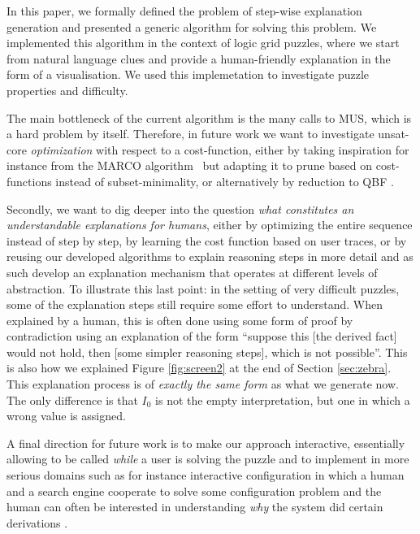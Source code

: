 In this paper, we formally defined the problem of step-wise explanation generation and presented a generic algorithm for solving this problem. 
We implemented this algorithm in the context of logic grid puzzles, where we start from natural language clues and provide a human-friendly explanation in the form of a visualisation.
We used this implemetation to investigate puzzle properties and difficulty. 


The main bottleneck of the current algorithm is the many calls to MUS, which is a hard problem by itself. 
Therefore, in future work we want to investigate unsat-core \emph{optimization} with respect to a cost-function, either by taking inspiration for instance from the MARCO algorithm~\cite{liffiton2013enumerating} but adapting it to prune based on cost-functions instead of subset-minimality, or alternatively by reduction to QBF \cite{QBF}.

Secondly, we want to dig deeper into the question \emph{what constitutes an understandable explanations for humans}, either by optimizing the entire sequence instead of step by step, by learning the cost function based on user traces, or by reusing our developed algorithms to explain reasoning steps in more detail and as such develop an explanation mechanism that operates at different levels of abstraction. 
To illustrate this last point: in the setting of very difficult puzzles, some of the explanation steps still require some effort to understand. 
When explained by a human, this is often done using some form of proof by contradiction using an explanation of the form ``suppose this [the derived fact] would not hold, then [some simpler reasoning steps], which is not possible''. This is also how we explained Figure \ref{fig:screen2} at the end of Section \ref{sec:zebra}.
This explanation process is of \emph{exactly the same form} as what we generate now. The only difference is that $I_0$ is not the empty interpretation, but one in which a wrong value is assigned. 

A final direction for future work is to make our approach interactive, essentially allowing \ourtool to be called \emph{while} a user is solving the puzzle and to implement in more serious domains such as for instance interactive configuration in which a human and a search engine cooperate to solve some configuration problem and the human can often be interested in understanding \emph{why} the system did certain derivations \cite{DBLP:journals/tplp/HertumDJD17,DBLP:conf/bnaic/CarbonnelleADVD19}. 


